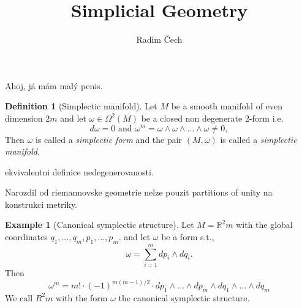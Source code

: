 \documentclass{article}
\title{Simplicial Geometry}
\author{Radim Čech}
\theoremstyle{definition}
\newtheorem{definition}[theorem]{Definition}
\newtheorem{example}[theorem]{Example}
\begin{document}
\maketitle

\noindent Ahoj, já mám malý penis. 

\begin{definition}[Simplectic manifold]
    Let $M$ be a smooth manifold of even dimension $2m$ and let $\omega \in \Omega^2(M)$ be a closed non degenerate 2-form i.e.
    \begin{equation*}
        d\omega = 0 \text{ and } \omega^m = \omega \wedge \omega \wedge \dots \wedge \omega \not = 0,
    \end{equation*}
    Then $\omega$ is called a \textit{simplectic form} and the pair $(M, \omega)$ is called a \textit{simplectic manifold}.
\end{definition}

ekvivalentni definice nedegenerovanosti.

Narozdil od riemannovske geometrie nelze pouzit partitions of unity na konstrukci metriky.


\begin{example}[Canonical symplectic structure]
    Let $M = \mathbb{R}^2m$ with the global coordinates ${q_1, \dots, q_m, p_1, \dots, p_m}$. and let $\omega$ be a form s.t., 
    \begin{equation*}
        \omega = \sum_{i=1}^m dp_i \wedge dq_i.
    \end{equation*}
    Then 
    \begin{equation*}
        \omega^m = m! \cdot (-1)^{m(m-1)/2} \cdot dp_1 \wedge \dots \wedge dp_m \wedge dq_1 \wedge \dots \wedge dq_m
    \end{equation*}
    We call $R^2m$ with the form $\omega$ the canonical symplectic structure.
\end{example}
\end{document}
